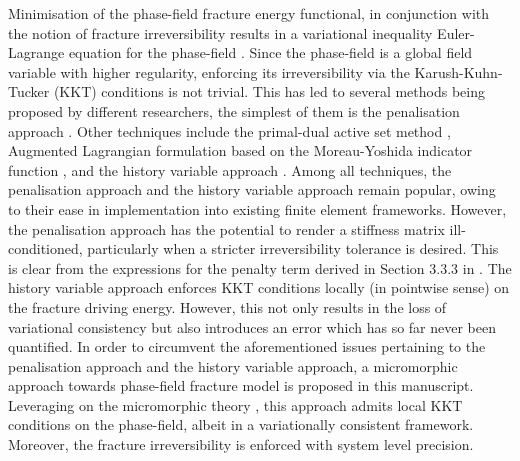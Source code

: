 \documentclass[11pt]{article}
\begin{document}
Minimisation of the phase-field fracture energy functional, in conjunction with the notion of fracture irreversibility results in a variational inequality Euler-Lagrange equation for the phase-field \cite{de2020numerical}. Since the phase-field is a global field variable with higher regularity, enforcing its irreversibility via the Karush-Kuhn-Tucker (KKT) conditions is not trivial. This has led to several methods being proposed by different researchers, the simplest of them is the penalisation approach \cite{Gerasimov2016,GERASIMOV2019990}. Other techniques include the primal-dual active set method \cite{Heister2015}, Augmented Lagrangian formulation based on the Moreau-Yoshida indicator function \cite{Wick2017a,wick2017modified}, and the history variable approach \cite{Miehe2010}. Among all techniques, the penalisation approach and the history variable approach remain popular, owing to their ease in implementation into existing finite element frameworks. However, the penalisation approach has the potential to render a stiffness matrix ill-conditioned, particularly when a stricter irreversibility tolerance is desired. This is clear from the expressions for the penalty term derived in Section 3.3.3 in \cite{GERASIMOV2019990}. The history variable approach enforces KKT conditions locally (in pointwise sense) on the fracture driving energy. However, this not only results in the loss of variational consistency but also introduces an error which has so far never been quantified. In order to circumvent the aforementioned issues pertaining to the penalisation approach and the history variable approach, a micromorphic approach towards phase-field fracture model is proposed in this manuscript. Leveraging on the micromorphic theory \cite{forest2009micromorphic}, this approach admits local KKT conditions on the phase-field, albeit in a variationally consistent framework. Moreover, the fracture irreversibility is enforced with system level precision.
\end{document}
